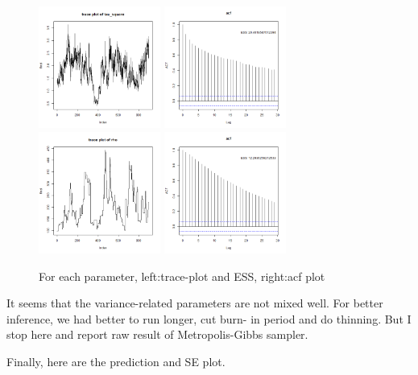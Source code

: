 \documentclass{article}
\begin{document}
\begin{figure}[!h]
    \includegraphics[width=4cm]{prob2_tau_square_traceplot.png}
    \includegraphics[width=4cm]{prob2_tau_square_acf.png}
    \includegraphics[width=4cm]{prob2_rho_traceplot.png}
    \includegraphics[width=4cm]{prob2_rho_acf.png}
    \caption{For each parameter, left:trace-plot and ESS, right:acf plot}
\end{figure}

It seems that the variance-related parameters are not mixed well. 
For better inference, we had better to run longer, cut burn- in period and do thinning.
But I stop here and report raw result of Metropolis-Gibbs sampler.

\clearpage
Finally, here are the prediction and SE plot.
\end{document}
